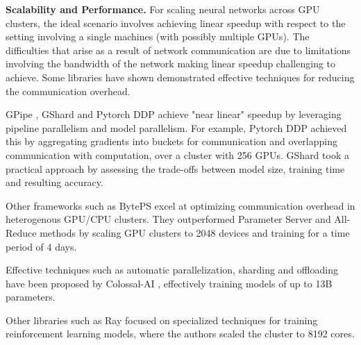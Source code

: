 \textbf{Scalability and Performance.}
For scaling neural networks across GPU clusters, the ideal scenario involves achieving linear speedup
with respect to the setting involving a single machines (with possibly multiple GPUs). The difficulties
that arise as a result of network communication are due to limitations involving the bandwidth of the
network making linear speedup challenging to achieve. Some libraries have shown demonstrated
effective techniques for reducing the communication overhead.

GPipe \cite{huang_gpipe_2019}, GShard \cite{lepikhin_gshard_2020} and Pytorch DDP \cite{li_pytorch_2020}
achieve "near linear" speedup by leveraging pipeline parallelism and model parallelism.
For example, Pytorch DDP achieved this by aggregating gradients into buckets
for communication and overlapping communication with computation, over a cluster with 256 GPUs.
GShard took a practical approach by assessing the trade-offs between model size, training time and
resulting accuracy.

Other frameworks such as BytePS \cite{jiang_unified_nodate} excel at optimizing communication
overhead in heterogenous GPU/CPU clusters. They outperformed Parameter Server and All-Reduce
methods by scaling GPU clusters to 2048 devices and training for a time period of 4 days.

Effective techniques such as automatic parallelization, sharding and offloading have been proposed by
Colossal-AI \cite{li_colossal-ai_2023}, effectively training models of up to 13B parameters.

Other libraries such as Ray \cite{moritz_ray_2018} focused on specialized techniques for training
reinforcement learning models, where the authors scaled the cluster to 8192 cores.


 


